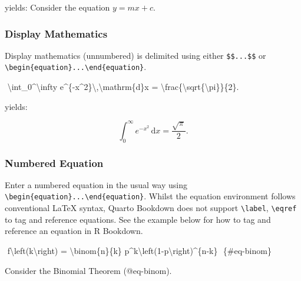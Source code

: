 \documentclass[
  letterpaper,
  oneside]{book}
\newenvironment{Shaded}{\begin{snugshade}}{\end{snugshade}}
\newcommand{\NormalTok}[1]{\textcolor[rgb]{0.00,0.23,0.31}{#1}}
\numberwithin{equation}{section}
\numberwithin{figure}{section}
\theoremstyle{break}
\theoremstyle{plain}
\theoremstyle{remark}
\begin{document}
yields: Consider the equation \(y = mx+c\).

\subsubsection*{Display Mathematics}\label{display-mathematics}

Display mathematics (unnumbered) is delimited using either
\texttt{\$\$...\$\$} or
\texttt{\textbackslash{}begin\{equation\}...\textbackslash{}end\{equation\}}.

\begin{Shaded}
\begin{Highlighting}[]
\NormalTok{$$}
\NormalTok{ \textbackslash{}int\_0\^{}\textbackslash{}infty e\^{}\{{-}x\^{}2\}\textbackslash{},\textbackslash{}mathrm\{d\}x = \textbackslash{}frac\{\textbackslash{}sqrt\{\textbackslash{}pi\}\}\{2\}. }
\NormalTok{$$}
\end{Highlighting}
\end{Shaded}

yields:

\[
 \int_0^\infty e^{-x^2}\,\mathrm{d}x = \frac{\sqrt{\pi}}{2}. 
\]

\subsubsection*{Numbered Equation}\label{numbered-equation}

Enter a numbered equation in the usual way using
\texttt{\textbackslash{}begin\{equation\}...\textbackslash{}end\{equation\}}.
Whilst the equation environment follows conventional LaTeX syntax,
Quarto Bookdown does not support \texttt{\textbackslash{}label},
\texttt{\textbackslash{}eqref} to tag and reference equations. See the
example below for how to tag and reference an equation in R Bookdown.

\begin{Shaded}
\begin{Highlighting}[]
\NormalTok{$$}
\NormalTok{  f\textbackslash{}left(k\textbackslash{}right) = \textbackslash{}binom\{n\}\{k\} p\^{}k\textbackslash{}left(1{-}p\textbackslash{}right)\^{}\{n{-}k\}}
\NormalTok{$$ \{\#eq{-}binom\}}
    
\NormalTok{Consider the Binomial Theorem (@eq{-}binom).}
\end{Highlighting}
\end{Shaded}
\end{document}
